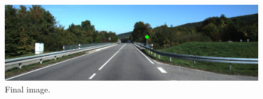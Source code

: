 \begin{figure}[h]
	\centering
        \begin{minipage}{1\textwidth}
        		\centering
		\includegraphics[width=\linewidth]{images/source/task4/1}
		\caption{Final image.}
		\label{fig:4a}
        \end{minipage}
\end{figure}






%
%
%
%
%
%  
%
%
